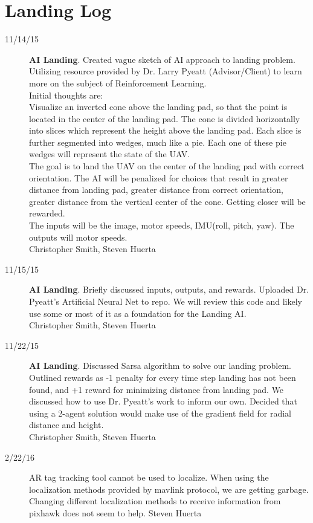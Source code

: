 \section{Landing Log}

\begin{description}
\item [11/14/15] \textbf{AI Landing}. Created vague sketch of AI approach to landing problem. Utilizing resource provided by Dr. Larry Pyeatt (Advisor/Client) to learn more on the subject of Reinforcement Learning. \\
Initial thoughts are:\\
Visualize an inverted cone above the landing pad, so that the point is located in the center of the landing pad. The cone is divided horizontally into slices which represent the height above the landing pad. Each slice is further segmented into wedges, much like a pie. Each one of these pie wedges will represent the state of the UAV. \\
The goal is to land the UAV on the center of the landing pad with correct orientation. The AI will be penalized for choices that result in greater distance from landing pad, greater distance from correct orientation, greater distance from the vertical center of the cone. Getting closer will be rewarded.\\
The inputs will be the image, motor speeds, IMU(roll, pitch, yaw). The outputs will motor speeds.\\
\hfill{Christopher Smith, Steven Huerta}

\item [11/15/15] \textbf{AI Landing}. Briefly discussed inputs, outputs, and rewards. Uploaded Dr. Pyeatt's Artificial Neural Net to repo. We will review this code and likely use some or most of it as a foundation for the Landing AI.\\
\hfill{Christopher Smith, Steven Huerta}\

\item [11/22/15] \textbf{AI Landing}. Discussed Sarsa algorithm to solve our landing problem. Outlined rewards as -1 penalty for every time step landing has not been found, and +1 reward for minimizing distance from landing pad. We discussed how to use Dr. Pyeatt's work to inform our own. Decided that using a 2-agent solution would make use of the gradient field for radial distance and height.\\
\hfill{Christopher Smith, Steven Huerta}

\item [2/22/16]  AR tag tracking tool cannot be used to localize. When using the localization methods provided by mavlink protocol, we are getting garbage. Changing different localization methods to receive information from pixhawk does not seem to help. \hfill{Steven Huerta}


\end{description}
